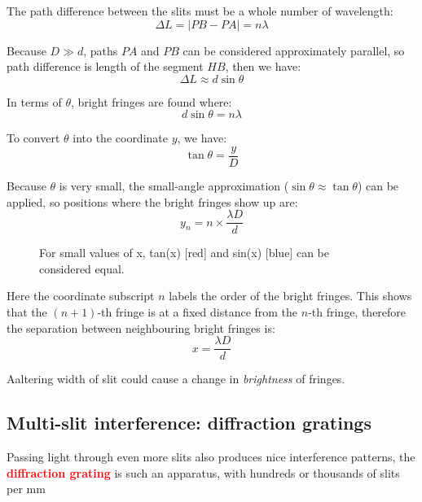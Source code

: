 \documentclass[a4paper,12pt]{book}
\newcommand{\keypoint}[1]{\textbf{\textcolor{red}{#1}}}
\renewenvironment{marginfigure}[1][]{\begin{figure}[htbp]\centering}{\end{figure}}
\newcommand{\tcbhighmath}[1]{\boxed{#1}}
\newcommand{\keypoint}[1]{\textbf{\textcolor{red}{#1}}}
\begin{document}
The path difference between the slits must be a whole number of wavelength: $$ \Delta L = \big|PB-PA\big| = n\lambda $$

Because $D \gg d$, paths $PA$ and $PB$ can be considered approximately parallel, so path difference is length of the segment $HB$, then we have: $$\Delta L \approx d\sin\theta$$

In terms of $\theta$, bright fringes are found where: $$ d\sin\theta = n\lambda $$

To convert $\theta$ into the coordinate $y$, we have: $$\tan \theta = \frac{y}{D}$$

Because $\theta$ is very small, the small-angle approximation ($\sin \theta \approx \tan \theta$) can be applied, so positions where the bright fringes show up are: $$ \tcbhighmath{y_n =  n \times \frac{\lambda D}{d}} $$\begin{marginfigure}

\caption{For small values of x, tan(x) [red] and sin(x) [blue] can be considered equal.} 
\end{marginfigure}

Here the coordinate subscript $n$ labels the order of the bright fringes. This shows that the $(n+1)$-th fringe is at a fixed distance from the $n$-th fringe, therefore the separation between neighbouring bright fringes is: $$ {x=\frac{\lambda D}{d}} $$

Aaltering width of slit could cause a change in \emph{brightness} of fringes.

\subsection{Multi-slit interference: diffraction gratings}

Passing light through even more slits also produces nice interference patterns, the \keypoint{diffraction grating} is such an apparatus, with hundreds or thousands of slits per mm
\end{document}
